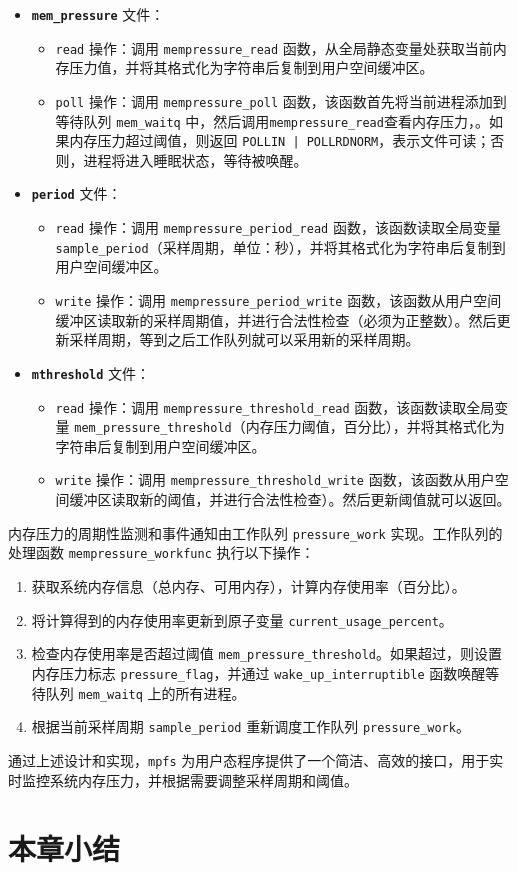 \begin{itemize}
    \item \textbf{\texttt{mem\_pressure}} 文件：
    \begin{itemize}
        \item \texttt{read} 操作：调用 \texttt{mempressure\_read} 函数，从全局静态变量处获取当前内存压力值，并将其格式化为字符串后复制到用户空间缓冲区。
        \item \texttt{poll} 操作：调用 \texttt{mempressure\_poll} 函数，该函数首先将当前进程添加到等待队列 \texttt{mem\_waitq} 中，然后调用\texttt{mempressure\_read}查看内存压力，。如果内存压力超过阈值，则返回 \texttt{POLLIN | POLLRDNORM}，表示文件可读；否则，进程将进入睡眠状态，等待被唤醒。
    \end{itemize}

\item \textbf{\texttt{period}} 文件：
    \begin{itemize}
        \item \texttt{read} 操作：调用 \texttt{mempressure\_period\_read} 函数，该函数读取全局变量 \texttt{sample\_period}（采样周期，单位：秒），并将其格式化为字符串后复制到用户空间缓冲区。
        \item \texttt{write} 操作：调用 \texttt{mempressure\_period\_write} 函数，该函数从用户空间缓冲区读取新的采样周期值，并进行合法性检查（必须为正整数）。然后更新采样周期，等到之后工作队列就可以采用新的采样周期。
    \end{itemize}

    \item \textbf{\texttt{mthreshold}} 文件：
    \begin{itemize}
    \item \texttt{read} 操作：调用 \texttt{mempressure\_threshold\_read} 函数，该函数读取全局变量 \texttt{mem\_pressure\_threshold}（内存压力阈值，百分比），并将其格式化为字符串后复制到用户空间缓冲区。
    \item \texttt{write} 操作：调用 \texttt{mempressure\_threshold\_write} 函数，该函数从用户空间缓冲区读取新的阈值，并进行合法性检查）。然后更新阈值就可以返回。
    \end{itemize}
\end{itemize}

内存压力的周期性监测和事件通知由工作队列 \texttt{pressure\_work} 实现。工作队列的处理函数 \texttt{mempressure\_workfunc} 执行以下操作：

\begin{enumerate}
    \item 获取系统内存信息（总内存、可用内存），计算内存使用率（百分比）。
    \item 将计算得到的内存使用率更新到原子变量 \texttt{current\_usage\_percent}。
    \item 检查内存使用率是否超过阈值 \texttt{mem\_pressure\_threshold}。如果超过，则设置内存压力标志 \texttt{pressure\_flag}，并通过 \texttt{wake\_up\_interruptible} 函数唤醒等待队列 \texttt{mem\_waitq} 上的所有进程。
    \item 根据当前采样周期 \texttt{sample\_period} 重新调度工作队列 \texttt{pressure\_work}。
\end{enumerate}

通过上述设计和实现，\texttt{mpfs} 为用户态程序提供了一个简洁、高效的接口，用于实时监控系统内存压力，并根据需要调整采样周期和阈值。





\section{本章小结}